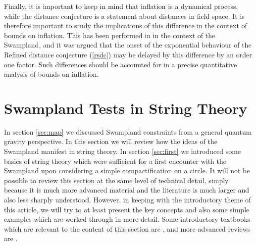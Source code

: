 \documentclass[11pt,a4paper]{article}
\numberwithin{equation}{section}
\numberwithin{table}{section}\setlength{\multlinegap}{25pt}
\begin{document}
Finally, it is important to keep in mind that inflation is a dynamical process, while the distance conjecture is a statement about distances in field space. It is therefore important to study the implications of this difference in the context of bounds on inflation. This has been performed in \cite{Landete:2018kqf,Schimmrigk:2018gch} in the context of the Swampland, and it was argued that the onset of the exponential behaviour of the Refined distance conjecture (\ref{rsdc}) may be delayed by this difference by an order one factor. Such differences should be accounted for in a precise quantitative analysis of bounds on inflation. 
 
\section{Swampland Tests in String Theory}
\label{sec:stringcomp}

In section \ref{sec:map} we discussed Swampland constraints from a general quantum gravity perspective. In this section we will review how the ideas of the Swampland manifest in string theory. In section \ref{sec:first} we introduced some basics of string theory which were sufficient for a first encounter with the Swampland upon considering a simple compactification on a circle. It will not be possible to review this section at the same level of technical detail, simply because it is much more advanced material and the literature is much larger and also less sharply understood. However, in keeping with the introductory theme of this article, we will try to at least present the key concepts and also some simple examples which are worked through in more detail. Some introductory textbooks which are relevant to the content of this section are \cite{Blumenhagen:2013fgp,Polchinski:1998rq,Polchinski:1998rr}, and more advanced reviews are \cite{Blumenhagen:2006ci,Grana:2005jc,Douglas:2006es}.
\end{document}
